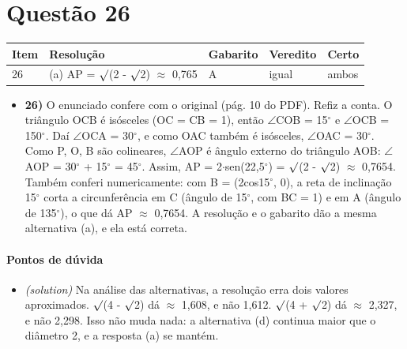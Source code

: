 \documentclass{article}%
\begin{document}
\section*{Questão 26}%
\begin{longtable}{@{}p{} p{} p{} p{} p{}@{}}\toprule Item & Resolução & Gabarito & Veredito & Certo \\ \midrule
26 & (a) AP = $\surd$(2 - $\surd$2) $\approx$ 0,765 & A & igual & ambos \\
\bottomrule\end{longtable}%
\begin{itemize}%
\item%
\textbf{26)} O enunciado confere com o original (pág. 10 do PDF). Refiz a conta. O triângulo OCB é isósceles (OC = CB = 1), então $\angle$COB = 15$^\circ$ e $\angle$OCB = 150$^\circ$. Daí $\angle$OCA = 30$^\circ$, e como OAC também é isósceles, $\angle$OAC = 30$^\circ$. Como P, O, B são colineares, $\angle$AOP é ângulo externo do triângulo AOB: $\angle$AOP = 30$^\circ$ + 15$^\circ$ = 45$^\circ$. Assim, AP = 2$\cdot$sen(22,5$^\circ$) = $\surd$(2 - $\surd$2) $\approx$ 0,7654. Também conferi numericamente: com B = (2cos15$^\circ$, 0), a reta de inclinação 15$^\circ$ corta a circunferência em C (ângulo de 15$^\circ$, com BC = 1) e em A (ângulo de 135$^\circ$), o que dá AP $\approx$ 0,7654. A resolução e o gabarito dão a mesma alternativa (a), e ela está correta.%
\end{itemize}%
\paragraph{Pontos de dúvida}%
\begin{itemize}%
\item%
\textit{(solution)} Na análise das alternativas, a resolução erra dois valores aproximados. $\surd$(4 - $\surd$2) dá $\approx$ 1,608, e não 1,612. $\surd$(4 + $\surd$2) dá $\approx$ 2,327, e não 2,298. Isso não muda nada: a alternativa (d) continua maior que o diâmetro 2, e a resposta (a) se mantém.%
\end{itemize}%
\end{document}

